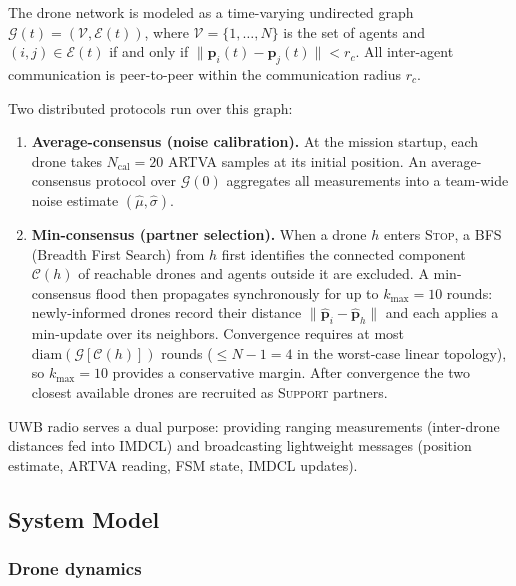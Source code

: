 \documentclass[journal,10pt,twocolumn]{IEEEtran}
\begin{document}
The drone network is modeled as a time-varying undirected graph
$\mathcal{G}(t) = (\mathcal{V}, \mathcal{E}(t))$, where
$\mathcal{V} = \{1, \ldots, N\}$ is the set of agents and
$(i,j) \in \mathcal{E}(t)$ if and only if
$\|\mathbf{p}_i(t) - \mathbf{p}_j(t)\| < r_c$.
All inter-agent communication is peer-to-peer within the communication radius $r_c$.

Two distributed protocols run over this graph:
\begin{enumerate}
  \item \textbf{Average-consensus (noise calibration).}
    At the mission startup, each drone takes $N_{\text{cal}} = 20$ ARTVA samples at
    its initial position.  An average-consensus protocol over
    $\mathcal{G}(0)$ aggregates all measurements into a team-wide noise
    estimate $(\hat{\mu}, \hat{\sigma})$.

  \item \textbf{Min-consensus (partner selection).}
    When a drone $h$ enters \textsc{Stop}, a BFS (Breadth First Search) from $h$ first identifies
    the connected component $\mathcal{C}(h)$ of reachable drones and agents
    outside it are excluded.  A min-consensus flood then propagates
    synchronously for up to $k_{\max} = 10$ rounds: newly-informed drones
    record their distance $\|\hat{\mathbf{p}}_i - \hat{\mathbf{p}}_h\|$ and
    each applies a min-update over its neighbors.  Convergence requires at
    most $\mathrm{diam}(\mathcal{G}[\mathcal{C}(h)])$ rounds ($\le N-1 = 4$
    in the worst-case linear topology), so $k_{\max} = 10$ provides a
    conservative margin. After convergence the two closest available
    drones are recruited as \textsc{Support} partners.
\end{enumerate}

UWB radio serves a dual purpose: providing ranging measurements
(inter-drone distances fed into IMDCL) and broadcasting lightweight messages (position estimate, ARTVA reading, FSM state, IMDCL updates).

\subsection{System Model}
\label{sec:sysmodel}

\subsubsection{Drone dynamics}
\end{document}
